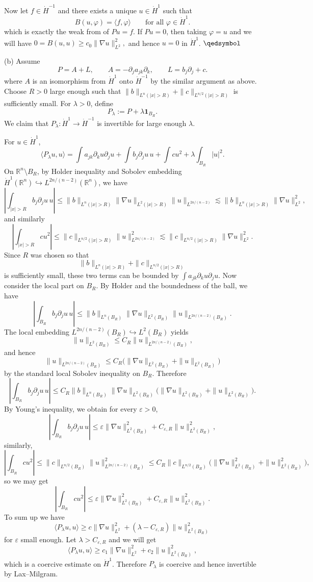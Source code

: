 \documentclass[lang=en,11pt,a4paper,citestyle=authoryear]{elegantpaper}
\newcommand{\prvd}{$\hfill \qedsymbol$}
\newcommand{\R}{\mathbb{R}}
\begin{document}
Now let $f\in \dot H^{-1}$ and there exists a unique $u\in \dot H^1$ such that
\[
B(u,\varphi)=\langle f,\varphi\rangle
\qquad \text{for all }\varphi\in \dot H^1.
\]
which is exactly the weak from of $Pu=f$. If $Pu=0$, then taking $\varphi=u$ and we will have
\(
0=B(u,u)\geq c_0\|\nabla u\|_{L^2}^2,
\) and hence $u=0$ in $\dot H^1$. \prvd\par
(b) Assume
\[
P = A+L,
\qquad A=-\partial_j a_{jk}\partial_k,
\qquad L=b_j\partial_j + c.
\]
where $A$ is an isomorphism from $\dot H^1$ onto $\dot H^{-1}$ by the similar argument as above. Choose $R>0$ large enough such that
\(
\|b\|_{L^n(|x|>R)} + \|c\|_{L^{n/2}(|x|>R)}
\)
is sufficiently small. For $\lambda>0$, define
\[
P_\lambda := P + \lambda \mathbf{1}_{B_R}.
\]
We claim that $P_\lambda:\dot H^1\to \dot H^{-1}$ is invertible for large enough $\lambda$.

For $u\in \dot H^1$,
\[
\langle P_\lambda u,u\rangle
= \int a_{jk}\partial_k u\partial_j u
+ \int b_j\partial_j u\,u
+ \int cu^2
+ \lambda\int_{B_R} |u|^2.
\]
On $\R^n\setminus B_R$, by Holder inequality and Sobolev embedding $\dot H^1(\R^n)\hookrightarrow L^{2n/(n-2)}(\R^n)$, we have
\[
\left|\int_{|x|>R} b_j\partial_j u\,u\right|
\leq \|b\|_{L^n(|x|>R)}\|\nabla u\|_{L^2(|x|>R)}\|u\|_{L^{2n/(n-2)}}
\lesssim \|b\|_{L^n(|x|>R)}\|\nabla u\|_{L^2}^2,
\]
and similarly
\[
\left|\int_{|x|>R} cu^2\right|
\leq \|c\|_{L^{n/2}(|x|>R)}\|u\|_{L^{2n/(n-2)}}^2
\lesssim \|c\|_{L^{n/2}(|x|>R)}\|\nabla u\|_{L^2}^2.
\]
Since $R$ was chosen so that
\[
\|b\|_{L^n(|x|>R)} + \|c\|_{L^{n/2}(|x|>R)}
\]
is sufficiently small, these two terms can be bounded by $\int a_{jk}\partial_k u\partial_j u$. Now consider the local part on $B_R$. By Holder and the boundedness of the ball, we have
\[
\left|\int_{B_R} b_j\partial_j u\,u\right|
\leq \|b\|_{L^n(B_R)}\|\nabla u\|_{L^2(B_R)}\|u\|_{L^{2n/(n-2)}(B_R)}.
\]
The local embedding $L^{2n/(n-2)}(B_R)\hookrightarrow L^2(B_R)$ yields
\[
\|u\|_{L^2(B_R)}\le C_R\|u\|_{L^{2n/(n-2)}(B_R)},
\]
and hence
\[
\|u\|_{L^{2n/(n-2)}(B_R)}\le C_R\bigl(\|\nabla u\|_{L^2(B_R)}+\|u\|_{L^2(B_R)}\bigr)
\]
by the standard local Sobolev inequality on $B_R$. Therefore
\[
\left|\int_{B_R} b_j\partial_j u\,u\right|
\leq C_R\|b\|_{L^n(B_R)}\|\nabla u\|_{L^2(B_R)}\bigl(\|\nabla u\|_{L^2(B_R)}+\|u\|_{L^2(B_R)}\bigr).
\]
By Young's inequality, we obtain for every $\varepsilon>0$,
\[
\left|\int_{B_R} b_j\partial_j u\,u\right|
\leq \varepsilon \|\nabla u\|_{L^2(B_R)}^2 + C_{\varepsilon,R}\|u\|_{L^2(B_R)}^2,
\]
similarly,
\[
\left|\int_{B_R} cu^2\right|
\leq \|c\|_{L^{n/2}(B_R)}\|u\|_{L^{2n/(n-2)}(B_R)}^2
\leq C_R\|c\|_{L^{n/2}(B_R)}\bigl(\|\nabla u\|_{L^2(B_R)}^2+\|u\|_{L^2(B_R)}^2\bigr),
\]
so we may get
\[
\left|\int_{B_R} cu^2\right|
\leq \varepsilon \|\nabla u\|_{L^2(B_R)}^2 + C_{\varepsilon,R}\|u\|_{L^2(B_R)}^2.
\]
To sum up we have
\[
\langle P_\lambda u,u\rangle
\geq c\|\nabla u\|_{L^2}^2 + (\lambda-C_{\varepsilon,R})\|u\|_{L^2(B_R)}^2
\]
for $\varepsilon$ small enough. Let $\lambda>C_{\varepsilon,R}$ and we will get
\[
\langle P_\lambda u,u\rangle \geq c_1\|\nabla u\|_{L^2}^2 + c_2\|u\|_{L^2(B_R)}^2,
\]
which is a coercive estimate on $\dot H^1$. Therefore $P_\lambda$ is coercive and hence invertible by Lax--Milgram.
\end{document}
